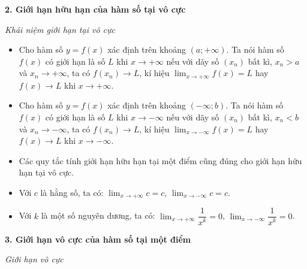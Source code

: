 \documentclass[12pt,a4paper]{extarticle}
\begin{document}
\noindent\textbf{2. Giới hạn hữu hạn của hàm số tại vô cực}
\vspace{0.2cm}

\noindent\textit{Khái niệm giới hạn tại vô cực}
\begin{itemize}
    \item Cho hàm số $y = f(x)$ xác định trên khoảng $(a; +\infty)$. Ta nói hàm số $f(x)$ có giới hạn là số $L$ khi $x \to +\infty$ nếu với dãy số $(x_n)$ bất kì, $x_n > a$ và $x_n \to +\infty$, ta có $f(x_n) \to L$, kí hiệu $\lim_{x \to +\infty} f(x) = L$ hay $f(x) \to L$ khi $x \to +\infty$.
    \item Cho hàm số $y = f(x)$ xác định trên khoảng $(-\infty; b)$. Ta nói hàm số $f(x)$ có giới hạn là số $L$ khi $x \to -\infty$ nếu với dãy số $(x_n)$ bất kì, $x_n < b$ và $x_n \to -\infty$, ta có $f(x_n) \to L$, kí hiệu $\lim_{x \to -\infty} f(x) = L$ hay $f(x) \to L$ khi $x \to -\infty$.
\end{itemize}
\begin{itemize}
    \item Các quy tắc tính giới hạn hữu hạn tại một điểm cũng đúng cho giới hạn hữu hạn tại vô cực.
    \item Với $c$ là hằng số, ta có: $\lim_{x \to +\infty} c = c$, $\lim_{x \to -\infty} c = c$.
    \item Với $k$ là một số nguyên dương, ta có: $\lim_{x \to +\infty} \dfrac{1}{x^k} = 0$, $\lim_{x \to -\infty} \dfrac{1}{x^k} = 0$.
\end{itemize}
\vspace{0.4cm}

\noindent\textbf{3. Giới hạn vô cực của hàm số tại một điểm}
\vspace{0.2cm}

\noindent\textit{Giới hạn vô cực}
\end{document}
